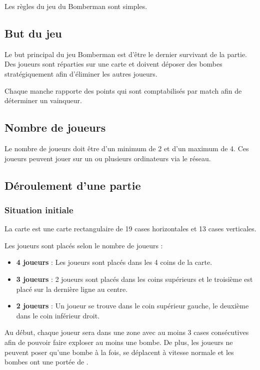 Les règles du jeu du Bomberman sont simples.

\subsection{But du jeu}

Le but principal du jeu Bomberman est d'être le dernier survivant de la partie. Des joueurs sont réparties sur une carte et doivent déposer des bombes stratégiquement afin d'éliminer les autres joueurs.

Chaque manche rapporte des points qui sont comptabilisés par match afin de déterminer un vainqueur.

\subsection{Nombre de joueurs}

Le nombre de joueurs doit être d'un minimum de 2 et d'un maximum de 4. Ces joueurs peuvent jouer sur un ou plusieurs ordinateurs via le réseau.

\subsection{Déroulement d'une partie}

\subsubsection{Situation initiale}

La carte est une carte rectangulaire de 19 cases horizontales et 13 cases verticales.

Les joueurs sont placés selon le nombre de joueurs : 
\begin{itemize}
\item \textbf{4 joueurs} : Les joueurs sont placés dans les 4 coins de la carte.
\item \textbf{3 joueurs} : 2 joueurs sont placés dans les coins supérieurs et le troisième est placé sur la dernière ligne au centre.
\item \textbf{2 joueurs} : Un joueur se trouve dans le coin supérieur gauche, le deuxième dans le coin inférieur droit.
\end{itemize}

Au début, chaque joueur sera dans une zone avec au moins 3 cases consécutives afin de pouvoir faire exploser au moins une bombe. De plus, les joueurs ne peuvent poser qu'une bombe à la fois, se déplacent à vitesse normale et les bombes ont une portée de \porteeParDefaut .

